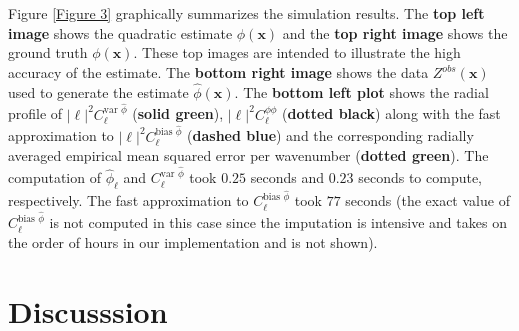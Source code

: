 \documentclass[10pt,noinfoline]{imsart}
\newcommand{\bs}{\boldsymbol}
\begin{document}
Figure \ref{Figure 3} graphically summarizes the simulation results. The \textbf{top left image} shows the quadratic estimate $\hat\phi(\bs x)$ and the \textbf{top right image} shows the ground truth $\phi(\bs x)$. These top images are intended to illustrate the high accuracy of the estimate. The \textbf{bottom right image} shows the data $Z^{obs}(\bs x)$ used to generate the estimate $\hat\phi(\bs x)$. The \textbf{bottom left plot} shows the radial profile of $|\bs \ell|^2C_{\bs \ell}^{\text{var }\hat\phi}$ (\textbf{solid green}), $|\bs \ell|^2C_{\bs \ell}^{\phi\phi}$ (\textbf{dotted black}) along with the fast approximation to $|\bs \ell|^2C_{\bs \ell}^{\text{bias }\hat\phi}$ (\textbf{dashed blue}) and the corresponding radially averaged empirical mean squared error per wavenumber (\textbf{dotted green}). The computation of $\hat\phi_{\bs \ell}$ and  $C_{\bs \ell}^{\text{var }\hat\phi}$ took $0.25$ seconds and $0.23$ seconds to compute, respectively. The fast approximation to $C_{\bs \ell}^{\text{bias }\hat\phi}$ took $77$ seconds (the exact value of $C_{\bs \ell}^{\text{bias }\hat\phi}$ is not computed in this case since the imputation is intensive and takes on the order of hours in our implementation and is not shown).





%
%
\section{Discusssion}
\label{section: Discussion}
\end{document}
